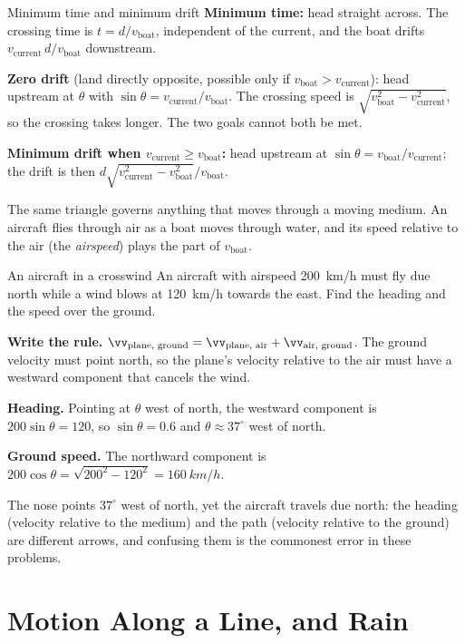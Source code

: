 \begin{keybox}{Minimum time and minimum drift}
\textbf{Minimum time:} head straight across. The crossing time is $t=d/v_{\text{boat}}$, independent of the
current, and the boat drifts $v_{\text{current}}\,d/v_{\text{boat}}$ downstream.

\textbf{Zero drift} (land directly opposite, possible only if $v_{\text{boat}}>v_{\text{current}}$): head
upstream at $\theta$ with $\sin\theta=v_{\text{current}}/v_{\text{boat}}$. The crossing speed is
$\sqrt{v_{\text{boat}}^2-v_{\text{current}}^2}$, so the crossing takes longer. The two goals cannot both be met.

\textbf{Minimum drift when $v_{\text{current}}\ge v_{\text{boat}}$:} head upstream at
$\sin\theta=v_{\text{boat}}/v_{\text{current}}$; the drift is then
$d\sqrt{v_{\text{current}}^2-v_{\text{boat}}^2}\big/v_{\text{boat}}$.
\end{keybox}

The same triangle governs anything that moves through a moving medium. An aircraft flies through air
as a boat moves through water, and its speed relative to the air (the \emph{airspeed}) plays the part of
$v_{\text{boat}}$.

\begin{exbox}{An aircraft in a crosswind}
An aircraft with airspeed \SI{200}{km/h} must fly due north while a wind blows at \SI{120}{km/h}
towards the east. Find the heading and the speed over the ground.

 \textbf{Write the rule.} $\vv_{\text{plane, ground}}=\vv_{\text{plane, air}}+\vv_{\text{air, ground}}$.
The ground velocity must point north, so the plane's velocity relative to the air must have a westward
component that cancels the wind.

 \textbf{Heading.} Pointing at $\theta$ west of north, the westward component is
$200\sin\theta=120$, so $\sin\theta=0.6$ and $\theta\approx37^\circ$ west of north.

 \textbf{Ground speed.} The northward component is
$200\cos\theta=\sqrt{200^2-120^2}=\SI{160}{km/h}$.

The nose points $37^\circ$ west of north, yet the aircraft travels due north: the heading (velocity
relative to the medium) and the path (velocity relative to the ground) are different arrows, and
confusing them is the commonest error in these problems.
\end{exbox}

\section{Motion Along a Line, and Rain}

